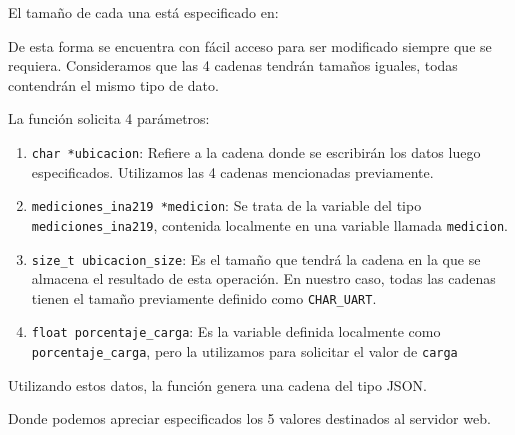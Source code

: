                     \par
                    
                    El tamaño de cada una está especificado en:\par

                    \par
                    
                    De esta forma se encuentra con fácil acceso para ser modificado siempre que se requiera. Consideramos que las 4 cadenas tendrán tamaños iguales, todas contendrán el mismo tipo de dato.\par
                    La función solicita 4 parámetros:\par
                    \begin{enumerate}
                    \setlength{\itemindent}{1.5em}
                        
                        \item \texttt{char *ubicacion}: Refiere a la cadena donde se escribirán los datos luego especificados. Utilizamos las 4 cadenas mencionadas previamente.
                        \item \texttt{mediciones\_ina219 *medicion}: Se trata de la variable del tipo \texttt{mediciones\_ina219}, contenida localmente en una variable llamada \texttt{medicion}.
                        \item \texttt{size\_t ubicacion\_size}: Es el tamaño que tendrá la cadena en la que se almacena el resultado de esta operación. En nuestro caso, todas las cadenas tienen el tamaño previamente definido como \texttt{CHAR\_UART}.
                        \item \texttt{float porcentaje\_carga}: Es la variable definida localmente como \texttt{porcentaje\_carga}, pero la utilizamos para solicitar el valor de \texttt{carga}
                    \end{enumerate}
                    
                    Utilizando estos datos, la función genera una cadena del tipo JSON.\par

                    \par
                    
                    Donde podemos apreciar especificados los 5 valores destinados al servidor web.\par

